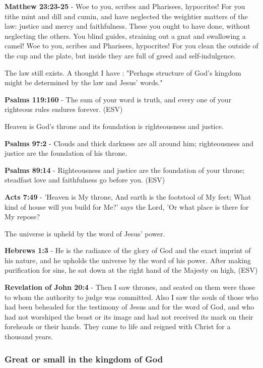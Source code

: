 \documentclass[11pt]{article}
\begin{document}
\textbf{Matthew 23:23-25} - Woe to you, scribes and Pharisees, hypocrites! For you tithe mint and dill and cumin, and have neglected the weightier matters of the law: justice and mercy and faithfulness. These you ought to have done, without neglecting the others.  You blind guides, straining out a gnat and swallowing a camel!  Woe to you, scribes and Pharisees, hypocrites! For you clean the outside of the cup and the plate, but inside they are full of greed and self-indulgence.

The law still exists. A thought I have : "Perhaps structure of God's kingdom might be determined by the law and Jesus' words."

\textbf{Psalms 119:160} - The sum of your word is truth, and every one of your righteous rules endures forever. (ESV)

Heaven is God's throne and its foundation is righteousness and justice.

\textbf{Psalms 97:2} - Clouds and thick darkness are all around him; righteousness and justice are the foundation of his throne.

\textbf{Psalms 89:14} - Righteousness and justice are the foundation of your throne; steadfast love and faithfulness go before you. (ESV)

\textbf{Acts 7:49} - 'Heaven is My throne, And earth is the footstool of My feet; What kind of house will you build for Me?' says the Lord, 'Or what place is there for My repose?

The universe is upheld by the word of Jesus' power.

\textbf{Hebrews 1:3} - He is the radiance of the glory of God and the exact imprint of his nature, and he upholds the universe by the word of his power. After making purification for sins, he sat down at the right hand of the Majesty on high, (ESV)

\textbf{Revelation of John 20:4} - Then I saw thrones, and seated on them were those to whom the authority to judge was committed. Also I saw the souls of those who had been beheaded for the testimony of Jesus and for the word of God, and who had not worshiped the beast or its image and had not received its mark on their foreheads or their hands. They came to life and reigned with Christ for a thousand years.

\subsubsection{Great or small in the kingdom of God}
\label{sec:orgfbac118}
\end{document}
